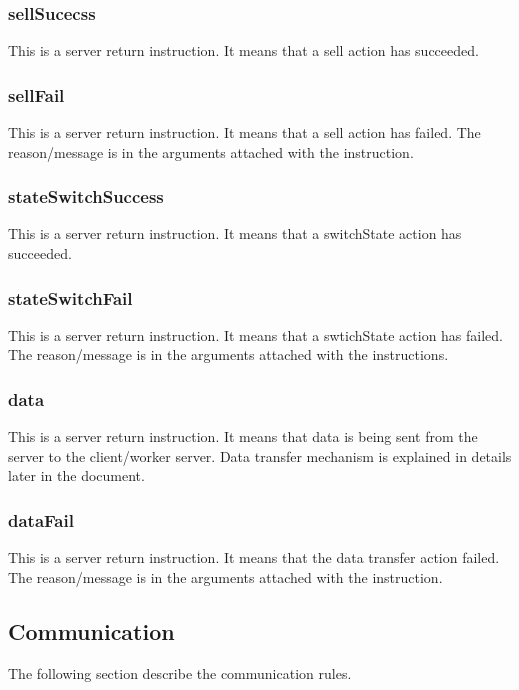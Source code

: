 \documentclass[a4paper]{article}
\begin{document}
\subsubsection{sellSucecss}
This is a server return instruction. It means that a sell action has succeeded.

\subsubsection{sellFail}
This is a server return instruction. It means that a sell action has failed.
The reason/message is in the arguments attached with the instruction.

\subsubsection{stateSwitchSuccess}
This is a server return instruction. It means that a switchState action has
succeeded.

\subsubsection{stateSwitchFail}
This is a server return instruction. It means that a swtichState action has
failed. The reason/message is in the arguments attached with the instructions.

\subsubsection{data}
This is a server return instruction. It means that data is being sent from the
server to the client/worker server. Data transfer mechanism is explained in
details later in the document.

\subsubsection{dataFail}
This is a server return instruction. It means that the data transfer action
failed. The reason/message is in the arguments attached with the instruction.

\subsection{Communication}
The following section describe the communication rules.
\end{document}
